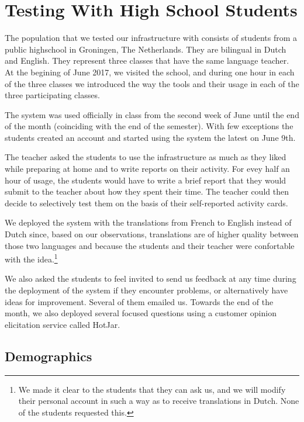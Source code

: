 
\newpage
\section{Testing With High School Students}
\label{sec:demographics}

The population that we tested our infrastructure with consists of \stcnt  students from a public highschool in Groningen, The Netherlands. They are bilingual in Dutch and English. They represent three classes that have the same language teacher. At the begining of June 2017, we visited the school, and during one hour in each of the three classes we introduced the way the tools and their usage in each of the three participating classes.

The system was used officially in class from the second week of June until the end of the month (coinciding with the end of the semester). With few exceptions the students created an account and started using the system the latest on June 9th. 

The teacher asked the students to use the infrastructure as much as they liked while preparing at home and to write reports on their activity. For evey half an hour of usage, the students would have to write a brief report that they would submit to the teacher about how they spent their time. The teacher could then decide to selectively test them on the basis of their self-reported activity cards.

We deployed the system with the translations from French to English instead of Dutch since, based on our observations, translations are of higher quality between those two languages and because the students and their teacher were confortable with the idea.\footnote{We made it clear to the students that they can ask us, and we will modify their personal account in such a way as to receive translations in Dutch. None of the students requested this.}

We also asked the students to feel invited to send us feedback at any time during the deployment of the system if they encounter problems, or alternatively have ideas for improvement. Several of them emailed us. Towards the end of the month, we also deployed several focused questions using a customer opinion elicitation service called HotJar. 

\subsection{Demographics}

